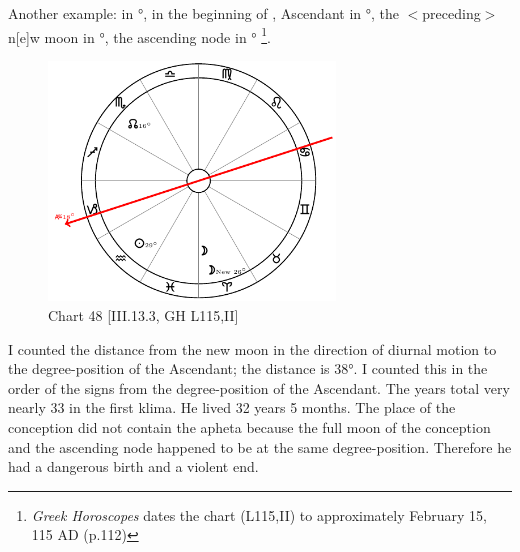 \newpage

Another example: \Sun\xspace in \Aquarius\xspace 29°, \Moon\xspace in the beginning of \Aries, Ascendant in \Capricorn\xspace 18°,
the $<$preceding$>$ n[e]w moon in \Aquarius\xspace 26°, the ascending node in \Scorpio\xspace 16°
\footnote{\textit{Greek Horoscopes} dates the chart (L115,II) to approximately February 15, 115 AD (p.112)}.

\clearpage
\begin{figure}
\centering
\vspace{-20pt}
\includegraphics[width=0.68\textwidth]{charts/3_13_3}
\caption{Chart 48 [III.13.3, GH L115,II]}
\label{fig:chart48}
\end{figure}

I counted the distance from the new moon in the direction of diurnal motion to the degree-position of the Ascendant; the distance is 38°. I counted this in the order of the signs from the degree-position of the Ascendant. The years total very nearly 33 in the first klima. He lived 32 years 5 months. The place of the conception did not contain the apheta because the full moon of the conception and the ascending node happened to be at the same degree-position. Therefore he had a dangerous birth and a violent end.

\newpage